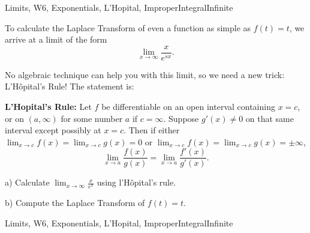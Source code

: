 \begin{tagblock}{Limits, W6, Exponentials, L'Hopital, ImproperIntegralInfinite}
\begin{question}
	To calculate the Laplace Transform of even a function as simple as $f(t)=t$, we arrive at a limit of the form
\[
\lim_{x\to\infty} \frac x {e^{sx}}.
\]

No algebraic technique can help you with this limit, so we need a new trick: L'H\^opital's Rule! The statement is:

\bigskip

\textbf{L'Hopital's Rule:} Let $f$ be differentiable on an open interval containing $x=c$, or on $(a,\infty)$ for some number $a$ if $c=\infty$. Suppose $g'(x)\ne 0$ on that same interval except possibly at $x=c$. Then if either $\displaystyle\lim_{x\to c}f(x)=\lim_{x\to c}g(x)=0$ or $\displaystyle\lim_{x\to c}f(x)=\lim_{x\to c}g(x)=\pm\infty$,
\[
\lim_{x\to a}\frac{f(x)}{g(x)}=\lim_{x\to a}\frac{f'(x)}{g'(x)}.
\]

a) Calculate $\displaystyle\lim_{x\to\infty}\frac{x}{e^{x}}$ using l'H\^opital's rule. 
 
\bigskip

b) Compute the Laplace Transform of $f(t)=t$.
	
	
\begin{tags}
	    Limits, W6, Exponentials, L'Hopital, ImproperIntegralInfinite
\end{tags}
	
\begin{diary}
	    
\end{diary}
	
\begin{solution}
	  
\end{solution}
	
\end{question}

\end{tagblock}

